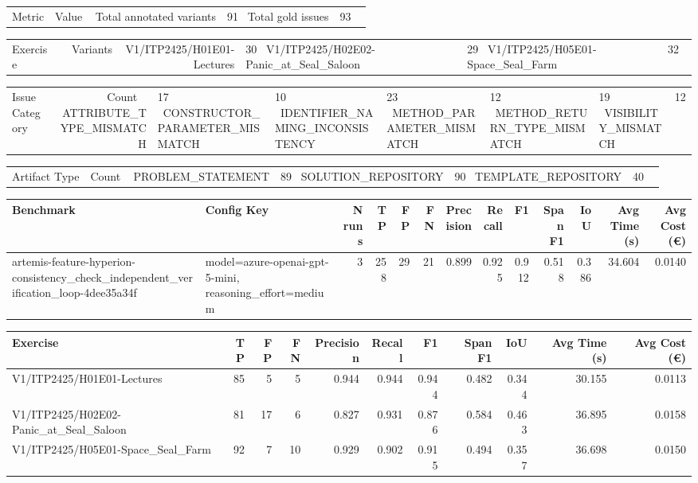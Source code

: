 \begin{tabular}{lr}
Metric & Value \
\hline
Total annotated variants & 91 \
Total gold issues & 93 \
\end{tabular}

\begin{tabular}{lr}
Exercise & Variants \
\hline
V1/ITP2425/H01E01-Lectures & 30 \
V1/ITP2425/H02E02-Panic\_at\_Seal\_Saloon & 29 \
V1/ITP2425/H05E01-Space\_Seal\_Farm & 32 \
\end{tabular}

\begin{tabular}{lr}
Issue Category & Count \
\hline
ATTRIBUTE\_TYPE\_MISMATCH & 17 \
CONSTRUCTOR\_PARAMETER\_MISMATCH & 10 \
IDENTIFIER\_NAMING\_INCONSISTENCY & 23 \
METHOD\_PARAMETER\_MISMATCH & 12 \
METHOD\_RETURN\_TYPE\_MISMATCH & 19 \
VISIBILITY\_MISMATCH & 12 \
\end{tabular}

\begin{tabular}{lr}
Artifact Type & Count \
\hline
PROBLEM\_STATEMENT & 89 \
SOLUTION\_REPOSITORY & 90 \
TEMPLATE\_REPOSITORY & 40 \
\end{tabular}

\begin{tabular}{llrrrrrrrrrrr}
Benchmark & Config Key & N runs & TP & FP & FN & Precision & Recall & F1 & Span F1 & IoU & Avg Time (s) & Avg Cost (€) \\
\hline
artemis-feature-hyperion-consistency\_check\_independent\_verification\_loop-4dee35a34f & model=azure-openai-gpt-5-mini, reasoning\_effort=medium & 3 & 258 & 29 & 21 & 0.899 & 0.925 & 0.912 & 0.518 & 0.386 & 34.604 & 0.0140 \\
\end{tabular}

\begin{tabular}{lrrrrrrrrrr}
Exercise & TP & FP & FN & Precision & Recall & F1 & Span F1 & IoU & Avg Time (s) & Avg Cost (€) \\
\hline
V1/ITP2425/H01E01-Lectures & 85 & 5 & 5 & 0.944 & 0.944 & 0.944 & 0.482 & 0.344 & 30.155 & 0.0113 \\
V1/ITP2425/H02E02-Panic\_at\_Seal\_Saloon & 81 & 17 & 6 & 0.827 & 0.931 & 0.876 & 0.584 & 0.463 & 36.895 & 0.0158 \\
V1/ITP2425/H05E01-Space\_Seal\_Farm & 92 & 7 & 10 & 0.929 & 0.902 & 0.915 & 0.494 & 0.357 & 36.698 & 0.0150 \\
\end{tabular}
